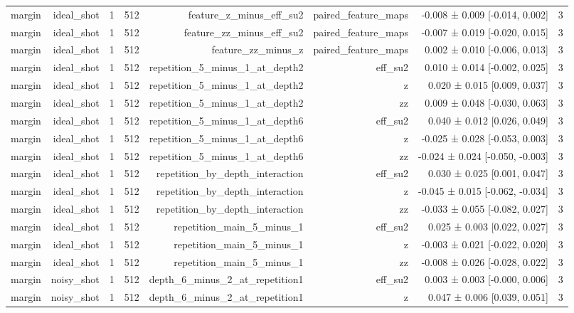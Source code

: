 \begin{table}
\begin{tabular}{lrrrrrrr}
margin & ideal\_shot & 1 & 512 & feature\_z\_minus\_eff\_su2 & paired\_feature\_maps & -0.008 ± 0.009 [-0.014, 0.002] & 3 \\
margin & ideal\_shot & 1 & 512 & feature\_zz\_minus\_eff\_su2 & paired\_feature\_maps & -0.007 ± 0.019 [-0.020, 0.015] & 3 \\
margin & ideal\_shot & 1 & 512 & feature\_zz\_minus\_z & paired\_feature\_maps & 0.002 ± 0.010 [-0.006, 0.013] & 3 \\
margin & ideal\_shot & 1 & 512 & repetition\_5\_minus\_1\_at\_depth2 & eff\_su2 & 0.010 ± 0.014 [-0.002, 0.025] & 3 \\
margin & ideal\_shot & 1 & 512 & repetition\_5\_minus\_1\_at\_depth2 & z & 0.020 ± 0.015 [0.009, 0.037] & 3 \\
margin & ideal\_shot & 1 & 512 & repetition\_5\_minus\_1\_at\_depth2 & zz & 0.009 ± 0.048 [-0.030, 0.063] & 3 \\
margin & ideal\_shot & 1 & 512 & repetition\_5\_minus\_1\_at\_depth6 & eff\_su2 & 0.040 ± 0.012 [0.026, 0.049] & 3 \\
margin & ideal\_shot & 1 & 512 & repetition\_5\_minus\_1\_at\_depth6 & z & -0.025 ± 0.028 [-0.053, 0.003] & 3 \\
margin & ideal\_shot & 1 & 512 & repetition\_5\_minus\_1\_at\_depth6 & zz & -0.024 ± 0.024 [-0.050, -0.003] & 3 \\
margin & ideal\_shot & 1 & 512 & repetition\_by\_depth\_interaction & eff\_su2 & 0.030 ± 0.025 [0.001, 0.047] & 3 \\
margin & ideal\_shot & 1 & 512 & repetition\_by\_depth\_interaction & z & -0.045 ± 0.015 [-0.062, -0.034] & 3 \\
margin & ideal\_shot & 1 & 512 & repetition\_by\_depth\_interaction & zz & -0.033 ± 0.055 [-0.082, 0.027] & 3 \\
margin & ideal\_shot & 1 & 512 & repetition\_main\_5\_minus\_1 & eff\_su2 & 0.025 ± 0.003 [0.022, 0.027] & 3 \\
margin & ideal\_shot & 1 & 512 & repetition\_main\_5\_minus\_1 & z & -0.003 ± 0.021 [-0.022, 0.020] & 3 \\
margin & ideal\_shot & 1 & 512 & repetition\_main\_5\_minus\_1 & zz & -0.008 ± 0.026 [-0.028, 0.022] & 3 \\
margin & noisy\_shot & 1 & 512 & depth\_6\_minus\_2\_at\_repetition1 & eff\_su2 & 0.003 ± 0.003 [-0.000, 0.006] & 3 \\
margin & noisy\_shot & 1 & 512 & depth\_6\_minus\_2\_at\_repetition1 & z & 0.047 ± 0.006 [0.039, 0.051] & 3 \\

\end{tabular}
\end{table}
